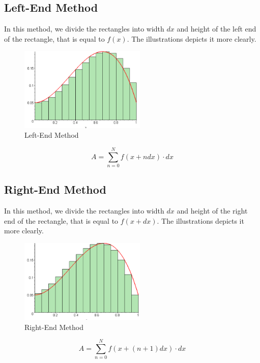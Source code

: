 \documentclass[12pt]{article}
\begin{document}
\subsection{Left-End Method}
In this method, we divide the rectangles into width $dx$ and height of the left end of the rectangle, that is equal to $f(x)$.
The illustrations depicts it more clearly.
\begin{figure}[H]
    \centering
    \includegraphics[width=6cm]{lefts.png}
    \caption{Left-End Method}
    \label{fig:lefts}
\end{figure}
\begin{equation}
    A=\sum_{n=0}^N f(x+ndx)\cdot dx
\end{equation}

\subsection{Right-End Method}
In this method, we divide the rectangles into width $dx$ and height of the right end of the rectangle, that is equal to $f(x+dx)$.
The illustrations depicts it more clearly.
\begin{figure}[H]
    \centering
    \includegraphics[width=6cm]{rights.png}
    \caption{Right-End Method}
    \label{fig:rights}
\end{figure}
\begin{equation}
    A=\sum_{n=0}^N f(x+(n+1)dx)\cdot dx
\end{equation}
\end{document}
